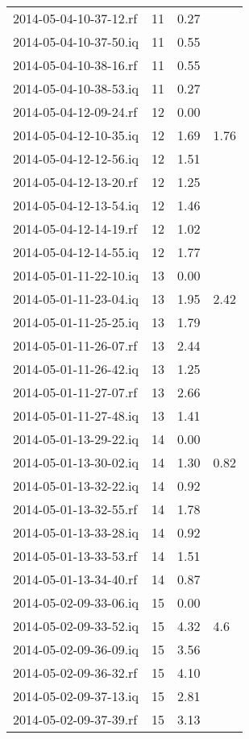 \begin{center}
\begin{longtable}{@{}l l l l@{}}
		2014-05-04-10-37-12.rf & 11 & 0.27 &  \\ 
		2014-05-04-10-37-50.iq & 11 & 0.55 &  \\ 
		2014-05-04-10-38-16.rf & 11 & 0.55 &  \\ 
		2014-05-04-10-38-53.iq & 11 & 0.27 &  \\ 
		2014-05-04-12-09-24.rf & 12 & 0.00 &  \\ 
		2014-05-04-12-10-35.iq & 12 & 1.69 & 1.76 \\ 
		2014-05-04-12-12-56.iq & 12 & 1.51 &  \\ 
		2014-05-04-12-13-20.rf & 12 & 1.25 &  \\ 
		2014-05-04-12-13-54.iq & 12 & 1.46 &  \\ 
		2014-05-04-12-14-19.rf & 12 & 1.02 &  \\ 
		2014-05-04-12-14-55.iq & 12 & 1.77 &  \\ 
		2014-05-01-11-22-10.iq & 13 & 0.00 &  \\ 
		2014-05-01-11-23-04.iq & 13 & 1.95 & 2.42 \\ 
		2014-05-01-11-25-25.iq & 13 & 1.79 &  \\ 
		2014-05-01-11-26-07.rf & 13 & 2.44 &  \\ 
		2014-05-01-11-26-42.iq & 13 & 1.25 &  \\ 
		2014-05-01-11-27-07.rf & 13 & 2.66 &  \\ 
		2014-05-01-11-27-48.iq & 13 & 1.41 &  \\ 
		2014-05-01-13-29-22.iq & 14 & 0.00 &  \\ 
		2014-05-01-13-30-02.iq & 14 & 1.30 & 0.82 \\ 
		2014-05-01-13-32-22.iq & 14 & 0.92 &  \\ 
		2014-05-01-13-32-55.rf & 14 & 1.78 &  \\ 
		2014-05-01-13-33-28.iq & 14 & 0.92 &  \\ 
		2014-05-01-13-33-53.rf & 14 & 1.51 &  \\ 
		2014-05-01-13-34-40.rf & 14 & 0.87 &  \\ 
		2014-05-02-09-33-06.iq & 15 & 0.00 &  \\ 
		2014-05-02-09-33-52.iq & 15 & 4.32 & 4.6 \\ 
		2014-05-02-09-36-09.iq & 15 & 3.56 &  \\ 
		2014-05-02-09-36-32.rf & 15 & 4.10 &  \\ 
		2014-05-02-09-37-13.iq & 15 & 2.81 &  \\ 
		2014-05-02-09-37-39.rf & 15 & 3.13 &  \\ 

\end{longtable}
\end{center}
